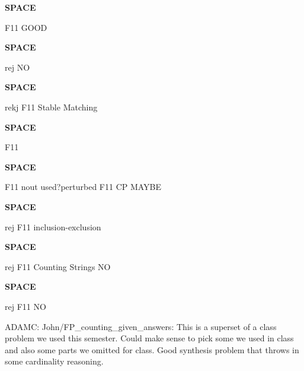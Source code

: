 \documentclass[quiz]{mcs}
\renewcommand{\examspace}{\textbf{SPACE}}
\begin{document}


\examspace
\begin{editingnotes}F11 GOOD\end{editingnotes}



\examspace %
\begin{editingnotes}rej NO \end{editingnotes}


\examspace
\begin{editingnotes}rekj F11 Stable Matching\end{editingnotes}



\examspace
\begin{editingnotes}F11\end{editingnotes}


\examspace 
\begin{editingnotes}F11 nout used?perturbed F11 CP MAYBE\end{editingnotes}

\examspace 
\begin{editingnotes}rej F11 inclusion-exclusion\end{editingnotes}


\examspace  
\begin{editingnotes}rej F11 Counting Strings NO \end{editingnotes}


\examspace
\begin{editingnotes}rej F11 NO

ADAMC: John/FP\_counting\_given\_answers: This is a superset of a class
problem we used this semester.  Could make sense to pick some we used
in class and also some parts we omitted for class.  Good synthesis
problem that throws in some cardinality reasoning.
\end{editingnotes}
\end{document}
